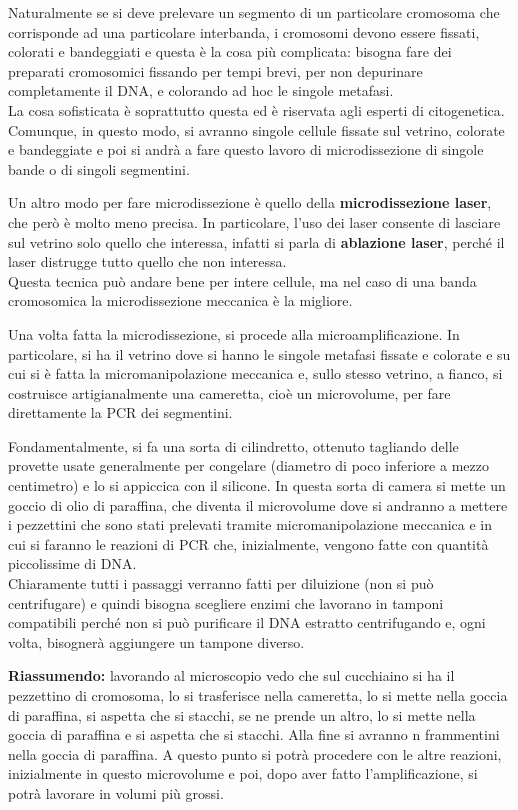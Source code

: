\documentclass[11pt]{book}
\begin{document}
Naturalmente se si deve prelevare un segmento di un particolare cromosoma che corrisponde ad una particolare interbanda, i cromosomi devono essere fissati, colorati e bandeggiati e questa è la cosa più complicata: bisogna fare dei preparati cromosomici fissando per tempi brevi, per non depurinare completamente il DNA, e colorando ad hoc le singole metafasi.\\
La cosa sofisticata è soprattutto questa ed è riservata agli esperti di citogenetica.\\
Comunque, in questo modo, si avranno singole cellule fissate sul vetrino, colorate e bandeggiate e poi si andrà a fare questo lavoro di microdissezione di singole bande o di singoli segmentini.

Un altro modo per fare microdissezione è quello della \textbf{microdissezione laser}, che però è molto meno precisa. In particolare, l’uso dei laser consente di lasciare sul vetrino solo quello che interessa, infatti si parla di \textbf{ablazione laser}, perché il laser distrugge tutto quello che non interessa.\\
Questa tecnica può andare bene per intere cellule, ma nel caso di una banda cromosomica la microdissezione meccanica è la migliore.

Una volta fatta la microdissezione, si procede alla microamplificazione.
In particolare, si ha il vetrino dove si hanno le singole metafasi fissate e colorate e su cui si è fatta la micromanipolazione meccanica e, sullo stesso vetrino, a fianco, si costruisce artigianalmente una cameretta, cioè un microvolume, per fare direttamente la PCR dei segmentini.

Fondamentalmente, si fa una sorta di cilindretto, ottenuto tagliando delle provette usate generalmente per congelare (diametro di poco inferiore a mezzo centimetro) e lo si appiccica con il silicone. In questa sorta di camera si mette un goccio di olio di paraffina, che diventa il microvolume dove si andranno a mettere i pezzettini che sono stati prelevati tramite micromanipolazione meccanica e in cui si faranno le reazioni di PCR che, inizialmente, vengono fatte con quantità piccolissime di DNA.\\
Chiaramente tutti i passaggi verranno fatti per diluizione (non si può centrifugare) e quindi bisogna scegliere enzimi che lavorano in tamponi compatibili perché non si può purificare il DNA estratto centrifugando e, ogni volta, bisognerà aggiungere un tampone diverso.

\textbf{Riassumendo:} lavorando al microscopio vedo che sul cucchiaino si ha il pezzettino di cromosoma, lo si trasferisce nella cameretta, lo si mette nella goccia di paraffina, si aspetta che si stacchi, se ne prende un altro, lo si mette nella goccia di paraffina e si aspetta che si stacchi. Alla fine si avranno n frammentini nella goccia di paraffina. A questo punto si potrà procedere con le altre reazioni, inizialmente in questo microvolume e poi, dopo aver fatto l’amplificazione, si potrà lavorare in volumi più grossi.
\end{document}
